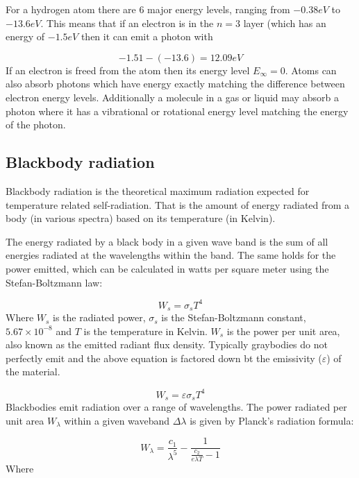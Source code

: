 For a hydrogen atom there are 6 major energy levels, ranging from $-0.38eV$ to $-13.6eV$. This means that if an electron is in the $n=3$ layer (which has an energy of $-1.5eV$ then it can emit a photon with 

\begin{equation}
	-1.51 - (-13.6) = 12.09eV
\end{equation}
If an electron is freed from the atom then its energy level $E_\infty = 0$. Atoms can also absorb photons which have energy exactly matching the difference between electron energy levels. Additionally a molecule in a gas or liquid may absorb a photon where it has a vibrational or rotational energy level matching the energy of the photon.

\subsection{Blackbody radiation}

Blackbody radiation is the theoretical maximum radiation expected for temperature related self-radiation. That is the amount of energy radiated from a body (in various spectra) based on its temperature (in Kelvin).

The energy radiated by a black body in a given wave band is the sum of all energies radiated at the wavelengths within the band. The same holds for the power emitted, which can be calculated in watts per square meter using the Stefan-Boltzmann law:

\begin{equation}
W_s = \sigma_sT^4
\end{equation}
Where $W_s$ is the radiated power, $\sigma_s$ is the Stefan-Boltzmann constant, $5.67\times10^{-8}$ and $T$ is the temperature in Kelvin. $W_s$ is the power per unit area, also known as the emitted radiant flux density. Typically graybodies do not perfectly emit and the above equation is factored down bt the emissivity ($\varepsilon$) of the material.

\begin{equation}
W_s = \varepsilon\sigma_sT^4
\end{equation}
Blackbodies emit radiation over a range of wavelengths. The power radiated per unit area $W_\lambda$ within a given waveband $\Delta\lambda$ is given by Planck's radiation formula:

\begin{equation}
W_\lambda = \frac{c_1}{\lambda^5} - \frac{1}{\frac{c_2}{e\lambda T}-1}
\end{equation}
Where 

